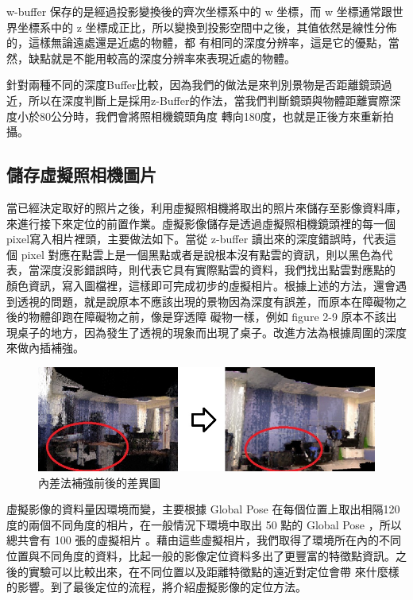     w-buffer 保存的是經過投影變換後的齊次坐標系中的 w 坐標，而 w 坐標通常跟世界坐標系中的 z 坐標成正比，所以變換到投影空間中之後，其值依然是線性分佈的，這樣無論遠處還是近處的物體，都
    有相同的深度分辨率，這是它的優點，當然，缺點就是不能用較高的深度分辨率來表現近處的物體。
    
    針對兩種不同的深度Buffer比較，因為我們的做法是來判別景物是否距離鏡頭過近，所以在深度判斷上是採用z-Buffer的作法，當我們判斷鏡頭與物體距離實際深度小於80公分時，我們會將照相機鏡頭角度
    轉向180度，也就是正後方來重新拍攝。
    

\subsection{儲存虛擬照相機圖片}
%
	當已經決定取好的照片之後，利用虛擬照相機將取出的照片來儲存至影像資料庫，來進行接下來定位的前置作業。虛擬影像儲存是透過虛擬照相機鏡頭裡的每一個pixel寫入相片裡頭，主要做法如下。當從 
	z-buffer 讀出來的深度錯誤時，代表這個 pixel 對應在點雲上是一個黑點或者是說根本沒有點雲的資訊，則以黑色為代表，當深度沒影錯誤時，則代表它具有實際點雲的資料，我們找出點雲對應點的
	顏色資訊，寫入圖檔裡，這樣即可完成初步的虛擬相片。根據上述的方法，還會遇到透視的問題，就是說原本不應該出現的景物因為深度有誤差，而原本在障礙物之後的物體卻跑在障礙物之前，像是穿透障
	礙物一樣，例如 figure 2-9 原本不該出現桌子的地方，因為發生了透視的現象而出現了桌子。改進方法為根據周圍的深度來做內插補強。
	
	\begin{figure}
	\begin{center}
	  \includegraphics[width=1.0\textwidth]{figures/Depth_Interpolation.jpg}
	  \caption{內差法補強前後的差異圖}
	  \label{fig:interpolation}
	\end{center}
	\end{figure}	
	
	虛擬影像的資料量因環境而變，主要根據 Global Pose 在每個位置上取出相隔120度的兩個不同角度的相片，在一般情況下環境中取出 50 點的 Global Pose ，所以總共會有 100 張的虛擬相片
	。藉由這些虛擬相片，我們取得了環境所在內的不同位置與不同角度的資料，比起一般的影像定位資料多出了更豐富的特徵點資訊。之後的實驗可以比較出來，在不同位置以及距離特徵點的遠近對定位會帶
	來什麼樣的影響。到了最後定位的流程，將介紹虛擬影像的定位方法。

